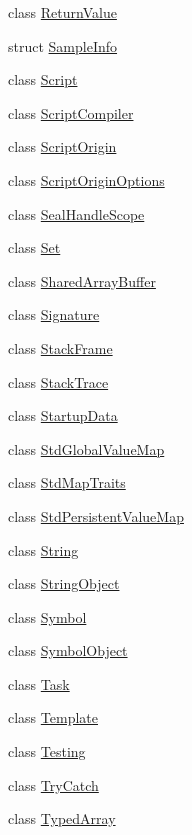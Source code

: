 \begin{DoxyCompactItemize}
\item 
class \hyperlink{classv8_1_1_return_value}{Return\+Value}
\item 
struct \hyperlink{structv8_1_1_sample_info}{Sample\+Info}
\item 
class \hyperlink{classv8_1_1_script}{Script}
\item 
class \hyperlink{classv8_1_1_script_compiler}{Script\+Compiler}
\item 
class \hyperlink{classv8_1_1_script_origin}{Script\+Origin}
\item 
class \hyperlink{classv8_1_1_script_origin_options}{Script\+Origin\+Options}
\item 
class \hyperlink{classv8_1_1_seal_handle_scope}{Seal\+Handle\+Scope}
\item 
class \hyperlink{classv8_1_1_set}{Set}
\item 
class \hyperlink{classv8_1_1_shared_array_buffer}{Shared\+Array\+Buffer}
\item 
class \hyperlink{classv8_1_1_signature}{Signature}
\item 
class \hyperlink{classv8_1_1_stack_frame}{Stack\+Frame}
\item 
class \hyperlink{classv8_1_1_stack_trace}{Stack\+Trace}
\item 
class \hyperlink{classv8_1_1_startup_data}{Startup\+Data}
\item 
class \hyperlink{classv8_1_1_std_global_value_map}{Std\+Global\+Value\+Map}
\item 
class \hyperlink{classv8_1_1_std_map_traits}{Std\+Map\+Traits}
\item 
class \hyperlink{classv8_1_1_std_persistent_value_map}{Std\+Persistent\+Value\+Map}
\item 
class \hyperlink{classv8_1_1_string}{String}
\item 
class \hyperlink{classv8_1_1_string_object}{String\+Object}
\item 
class \hyperlink{classv8_1_1_symbol}{Symbol}
\item 
class \hyperlink{classv8_1_1_symbol_object}{Symbol\+Object}
\item 
class \hyperlink{classv8_1_1_task}{Task}
\item 
class \hyperlink{classv8_1_1_template}{Template}
\item 
class \hyperlink{classv8_1_1_testing}{Testing}
\item 
class \hyperlink{classv8_1_1_try_catch}{Try\+Catch}
\item 
class \hyperlink{classv8_1_1_typed_array}{Typed\+Array}

\end{DoxyCompactItemize}
